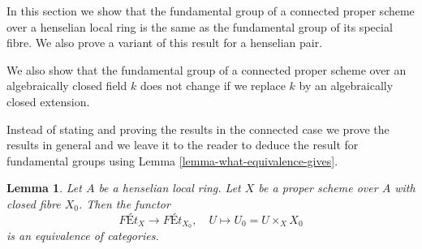 \documentclass{stacks-project}
\theoremstyle{plain}
\newtheorem{lemma}[subsection]{Lemma}
\theoremstyle{definition}
\theoremstyle{remark}
\numberwithin{equation}{subsection}
\begin{document}
\noindent
In this section we show that the fundamental group of a connected proper
scheme over a henselian local ring is the same as the fundamental
group of its special fibre. We also prove a variant of this result for
a henselian pair.

\medskip\noindent
We also show that the fundamental
group of a connected proper scheme over an algebraically closed field $k$
does not change if we replace $k$ by an algebraically closed extension.

\medskip\noindent
Instead of stating and proving the results in the connected case
we prove the results in general and we leave it to the reader to deduce
the result for fundamental groups using
Lemma \ref{lemma-what-equivalence-gives}.

\begin{lemma}
\label{lemma-finite-etale-on-proper-over-henselian}
Let $A$ be a henselian local ring. Let $X$ be a proper scheme over $A$
with closed fibre $X_0$. Then the functor
$$
\textit{F\'Et}_X \to \textit{F\'Et}_{X_0},\quad
U \longmapsto U_0 = U \times_X X_0
$$
is an equivalence of categories.
\end{lemma}
\end{document}
